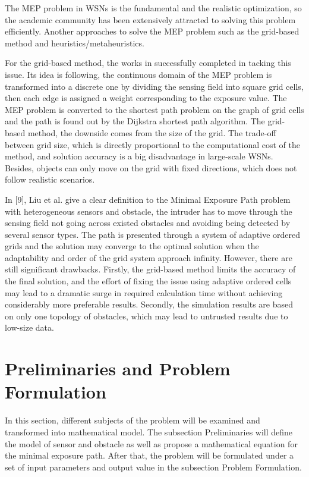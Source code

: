 \documentclass[final]{elsarticle}
\begin{document}
The MEP problem in WSNs is the fundamental and the realistic optimization, so the academic community has been extensively attracted to solving this problem efficiently. Another approaches to solve the MEP problem such as the grid-based method and heuristics/metaheuristics. 

For the grid-based method, the works in \cite{meguerdichian2001exposure, veltri2003minimal,megerian2002exposure, b9, b10} successfully completed in tacking this issue. Its idea is following, the continuous domain of the MEP problem is transformed into a discrete one by dividing the sensing field into square grid cells, then each edge is assigned a weight corresponding to the exposure value. The MEP problem is converted to the shortest path problem on the graph of grid cells and the path is found out by the Dijkstra shortest path algorithm. The grid-based method, the downside comes from the size of the grid. The trade-off between grid size, which is directly proportional to the computational cost of the method, and solution accuracy is a big disadvantage in large-scale WSNs. Besides, objects can only move on the grid with fixed directions, which does not follow realistic scenarios.



In [9], Liu et al. give a clear definition to the Minimal Exposure Path problem with heterogeneous sensors and obstacle, the intruder has to move through the sensing field not going across existed obstacles and avoiding being detected by several sensor types. The path is presented through a system of adaptive ordered grids and the solution may converge to the optimal solution when the adaptability and order of the grid system approach infinity. However, there are still significant drawbacks. Firstly, the grid-based method limits the accuracy of the final solution, and the effort of fixing the issue using adaptive ordered cells may lead to a dramatic surge in required calculation time without achieving considerably more preferable results. Secondly, the simulation results are based on only one topology of obstacles, which may lead to untrusted results due to low-size data.

\section{Preliminaries and Problem Formulation}

In this section, different subjects of the problem will be examined and transformed into mathematical model. The subsection Preliminaries will define the model of sensor and obstacle as well as propose a mathematical equation for the minimal exposure path. After that, the problem will be formulated under a set of input parameters and output value in the subsection Problem Formulation.
\end{document}
